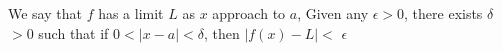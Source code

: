 \documentclass[preview]{standalone}
\begin{document}
\begin{center}
We say that $f$ has a limit $L$ as $x$ approach to $a$, Given any $\epsilon$$ > 0$, there exists $\delta$ $ > 0$ such that if $0 < |x - a| < \delta$, then $|f(x) - L| <$ $\epsilon$
\end{center}
\end{document}
